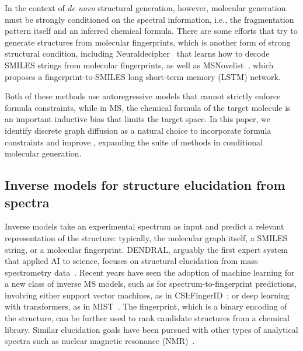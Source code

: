 \documentclass{article}
\theoremstyle{plain}
\theoremstyle{definition}
\theoremstyle{remark}
\begin{document}
In the context of \textit{de novo} structural generation, however, molecular generation must be strongly conditioned on the spectral information, i.e., the fragmentation pattern itself and an inferred chemical formula. There are some efforts that try to generate structures from molecular fingerprints, which is another form of strong structural condition, including Neuraldecipher~\citep{le2020neuraldecipher} that learns how to decode SMILES strings from molecular fingerprints, as well as MSNovelist~\citep{stravs2022msnovelist}, which proposes a fingerprint-to-SMILES long short-term memory (LSTM) network. 

Both of these methods use autoregressive models that cannot strictly enforce formula constraints, while in MS, the chemical formula of the target molecule is an important inductive bias that limits the target space. In this paper, we identify discrete graph diffusion as a natural choice to incorporate formula constraints and improve \citet{vignac2023digress}, expanding the suite of methods in conditional molecular generation.


\subsection{Inverse models for structure elucidation from spectra}

Inverse models take an experimental spectrum as input and predict a relevant representation of the structure: typically, the molecular graph itself, a SMILES string, or a molecular fingerprint. 
DENDRAL, arguably the first expert system that applied AI to science, focuses on structural elucidation from mass spectrometry data~\citep{lindsay1980dendral}. 
Recent years have seen the adoption of machine learning for a new class of inverse MS models, such as for spectrum-to-fingerprint predictions, involving either support vector machines, as in CSI:FingerID~\citep{duhrkop2015csifingerid}; or deep learning with transformers, as in MIST~\citep{goldman2023mist}. The fingerprint, which is a binary encoding of the structure, can be further used to rank candidate structures from a chemical library. Similar elucidation goals have been pursued with other types of analytical spectra such as nuclear magnetic resonance (NMR)~\citep{alberts2023learning}. 
\end{document}
